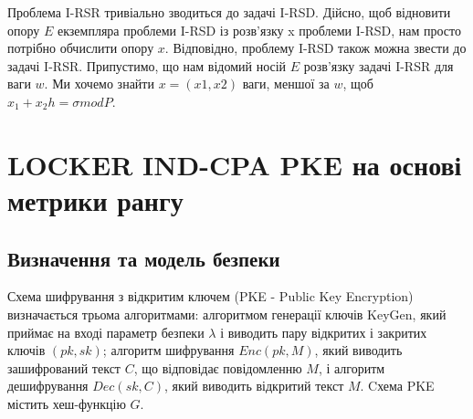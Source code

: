 Проблема I-RSR тривіально зводиться до задачі I-RSD. 
Дійсно, щоб відновити опору $E$ екземпляра проблеми I-RSD із розв’язку x проблеми I-RSD, нам просто потрібно обчислити опору $x$.
Відповідно, проблему I-RSD також можна звести до задачі I-RSR. Припустимо, що нам відомий носій $E$ розв’язку задачі I-RSR для ваги $w$. Ми хочемо знайти $x=(x1,x2)$ ваги, меншої за $w$, щоб $x_1+x_2 h=\sigma modP$.


\section{LOCKER IND-CPA PKE на основі метрики рангу}

\subsection{Визначення та модель безпеки}

Схема шифрування з відкритим ключем (PKE - Public Key Encryption) 
визначається трьома алгоритмами: алгоритмом генерації ключів KeyGen, 
який приймає на вході параметр безпеки $\lambda$ 
і виводить пару відкритих і закритих ключів $(pk,sk)$; 
алгоритм шифрування $Enc(pk,M)$, який виводить зашифрований текст $C$, 
що відповідає повідомленню $M$, і алгоритм дешифрування $Dec(sk,C)$, 
який виводить відкритий текст $M$.
Cхема PKE містить хеш-функцію $G$.

